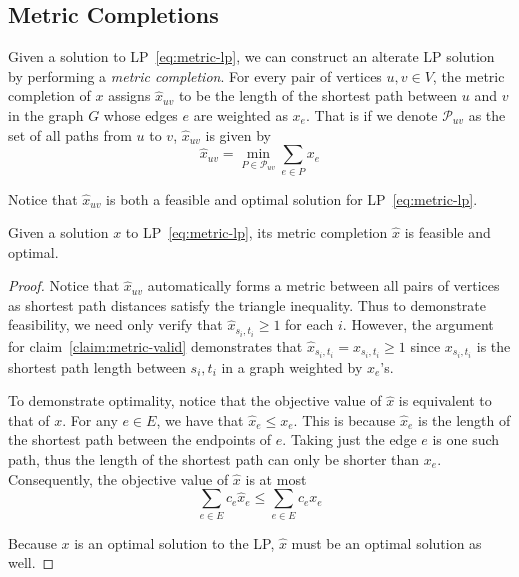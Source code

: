 \subsection{Metric Completions}

Given a solution to LP~\ref{eq:metric-lp}, we can construct an alterate LP solution by performing a \emph{metric completion}. For every pair of vertices $u, v \in V$, the metric completion of $x$ assigns $\hat{x}_{uv}$ to be the length of the shortest path between $u$ and $v$ in the graph $G$ whose edges $e$ are weighted as $x_e$. That is if we denote $\mathcal{P}_{uv}$ as the set of all paths from $u$ to $v$, $\hat{x}_{uv}$ is given by
\begin{equation*}
\hat{x}_{uv} = \min_{P \in \mathcal{P}_{uv}} \sum_{e \in P} x_e
\end{equation*}

Notice that $\hat{x}_{uv}$ is both a feasible and optimal solution for LP~\ref{eq:metric-lp}.

\begin{claim}\label{claim:metric-completion}
Given a solution $x$ to LP~\ref{eq:metric-lp}, its metric completion $\hat{x}$ is feasible and optimal.
\end{claim}
\begin{proof}
Notice that $\hat{x}_{uv}$ automatically forms a metric between all pairs of vertices as shortest path distances satisfy the triangle inequality. Thus to demonstrate feasibility, we need only verify that $\hat{x}_{s_i, t_i} \geq 1$ for each $i$. However, the argument for claim~\ref{claim:metric-valid} demonstrates that $\hat{x}_{s_i, t_i} = x_{s_i, t_i} \geq 1$ since $x_{s_i, t_i}$ is the shortest path length between $s_i, t_i$ in a graph weighted by $x_e$'s.

To demonstrate optimality, notice that the objective value of $\hat{x}$ is equivalent to that of $x$. For any $e \in E$, we have that $\hat{x}_e \leq x_e$. This is because $\hat{x}_e$ is the length of the shortest path between the endpoints of $e$. Taking just the edge $e$ is one such path, thus the length of the shortest path can only be shorter than $x_e$. Consequently, the objective value of $\hat{x}$ is at most
\begin{equation*}
\sum_{e \in E} c_e \hat{x}_e \leq \sum_{e \in E} c_e x_e
\end{equation*}

Because $x$ is an optimal solution to the LP, $\hat{x}$ must be an optimal solution as well.
\end{proof}

